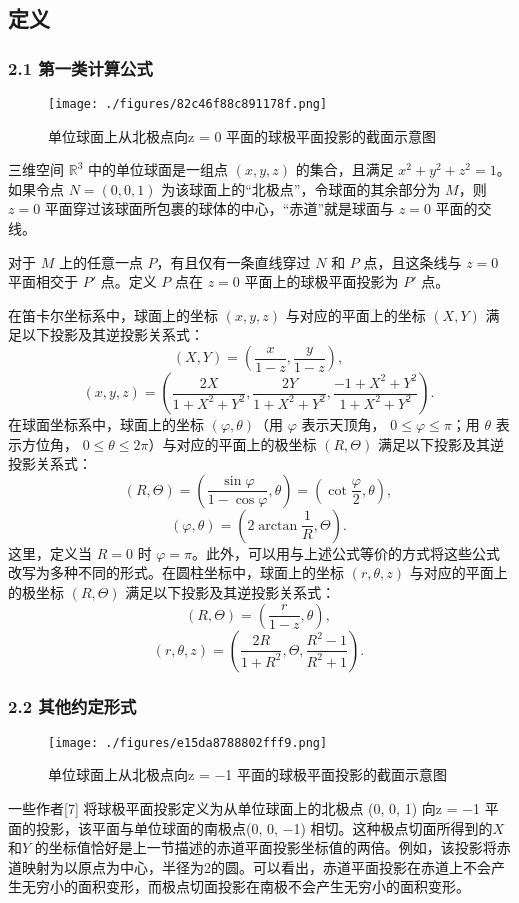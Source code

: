\subsection{定义}
\subsubsection{2.1 第一类计算公式}
\begin{figure}[ht]
\centering
\texttt{[image: ./figures/82c46f88c891178f.png]}
\caption{单位球面上从北极点向z = 0 平面的球极平面投影的截面示意图} \label{fig_QJPMTY_1}
\end{figure}
三维空间 $\mathbb{R}^3$ 中的单位球面是一组点 $(x, y, z)$ 的集合，且满足 $x^2 + y^2 + z^2 = 1$。如果令点 $N = (0, 0, 1)$ 为该球面上的“北极点”，令球面的其余部分为 $M$，则 $z = 0$ 平面穿过该球面所包裹的球体的中心，“赤道”就是球面与 $z = 0$ 平面的交线。

对于 $M$ 上的任意一点 $P$，有且仅有一条直线穿过 $N$ 和 $P$ 点，且这条线与 $z = 0$ 平面相交于 $P'$ 点。定义 $P$ 点在 $z = 0$ 平面上的球极平面投影为 $P'$ 点。

在笛卡尔坐标系中，球面上的坐标 \((x, y, z)\) 与对应的平面上的坐标 \((X, Y)\) 满足以下投影及其逆投影关系式：
$$(X, Y) = \left( \frac{x}{1 - z}, \frac{y}{1 - z} \right),~$$
$$(x, y, z) = \left( \frac{2X}{1 + X^2 + Y^2}, \frac{2Y}{1 + X^2 + Y^2}, \frac{-1 + X^2 + Y^2}{1 + X^2 + Y^2} \right).~$$
在球面坐标系中，球面上的坐标 \((\varphi, \theta)\)（用 \(\varphi\) 表示天顶角， \(0 \leq \varphi \leq \pi\)；用 \(\theta\) 表示方位角， \(0 \leq \theta \leq 2\pi\)）与对应的平面上的极坐标 \((R, \Theta)\) 满足以下投影及其逆投影关系式：
$$(R, \Theta) = \left( \frac{\sin \varphi}{1 - \cos \varphi}, \theta \right) = \left( \cot \frac{\varphi}{2}, \theta \right),~$$
$$(\varphi, \theta) = \left( 2 \arctan \frac{1}{R}, \Theta \right).~$$
这里，定义当 \(R = 0\) 时 \(\varphi = \pi\)。此外，可以用与上述公式等价的方式将这些公式改写为多种不同的形式。在圆柱坐标中，球面上的坐标 \((r, \theta, z)\) 与对应的平面上的极坐标 \((R, \Theta)\) 满足以下投影及其逆投影关系式：
$$(R, \Theta) = \left( \frac{r}{1 - z}, \theta \right),~$$
$$(r, \theta, z) = \left( \frac{2R}{1 + R^2}, \Theta, \frac{R^2 - 1}{R^2 + 1} \right).~$$
\subsubsection{2.2 其他约定形式}
\begin{figure}[ht]
\centering
\texttt{[image: ./figures/e15da8788802fff9.png]}
\caption{单位球面上从北极点向z = −1 平面的球极平面投影的截面示意图} \label{fig_QJPMTY_3}
\end{figure}
一些作者[7] 将球极平面投影定义为从单位球面上的北极点 (0, 0, 1) 向z = −1 平面的投影，该平面与单位球面的南极点(0, 0, −1) 相切。这种极点切面所得到的$X$ 和$Y$ 的坐标值恰好是上一节描述的赤道平面投影坐标值的两倍。例如，该投影将赤道映射为以原点为中心，半径为2的圆。可以看出，赤道平面投影在赤道上不会产生无穷小的面积变形，而极点切面投影在南极不会产生无穷小的面积变形。

